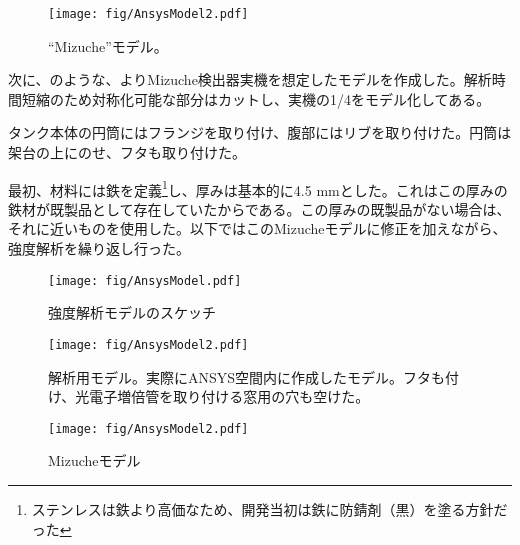 \begin{wrapfigure}{r}{0.5\textwidth}
\begin{center}
\texttt{[image: fig/AnsysModel2.pdf]}
\caption[``Mizuche''モデル]{``Mizuche''モデル。}
\label{AnsysModel3}
\end{center}
\end{wrapfigure}
\fi

次に、のような、よりMizuche検出器実機を想定したモデルを作成した。解析時間短縮のため対称化可能な部分はカットし、実機の1/4をモデル化してある。

タンク本体の円筒にはフランジを取り付け、腹部にはリブを取り付けた。円筒は架台の上にのせ、フタも取り付けた。

最初、材料には鉄を定義\footnote{ステンレスは鉄より高価なため、開発当初は鉄に防錆剤（黒）を塗る方針だった}し、厚みは基本的に4.5 mmとした。これはこの厚みの鉄材が既製品として存在していたからである。この厚みの既製品がない場合は、それに近いものを使用した。以下ではこのMizucheモデルに修正を加えながら、強度解析を繰り返し行った。

\begin{figure}[htbp]
\begin{minipage}{0.47\textwidth}
\begin{center}
\texttt{[image: fig/AnsysModel.pdf]}
\caption[強度解析モデルのスケッチ]{強度解析モデルのスケッチ}
\label{AnsysModel}
\end{center}
\end{minipage}
\begin{minipage}{0.47\textwidth}
\begin{center}
\texttt{[image: fig/AnsysModel2.pdf]}
\caption[強度解析モデル]{解析用モデル。実際にANSYS空間内に作成したモデル。フタも付け、光電子増倍管を取り付ける窓用の穴も空けた。}
\label{AnsysModel2}
\end{center}
\end{minipage}
\end{figure}
\fi %

\begin{figure}[htbp]
\begin{center}
\texttt{[image: fig/AnsysModel2.pdf]}
\caption[Mizucheモデル]{Mizucheモデル}
\label{AnsysModel3}
\end{center}
\end{figure}

